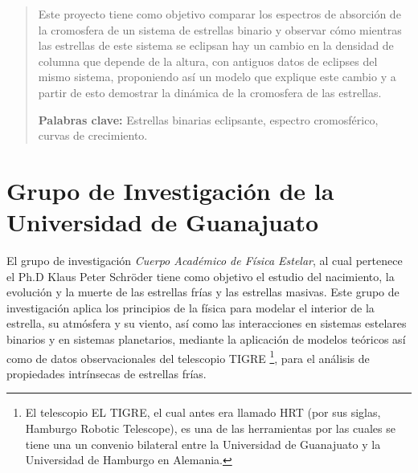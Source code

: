 \documentclass[11pt]{article}
\begin{document}
\newpage
\begin{abstract}
\noindent Este proyecto tiene como objetivo comparar los espectros de absorción de la cromosfera de un sistema de estrellas binario y observar cómo mientras las estrellas de este sistema se eclipsan hay un cambio en la densidad de columna que depende de la altura, con antiguos datos de eclipses del mismo sistema, proponiendo así un modelo que explique este cambio y a partir de esto demostrar la dinámica de la cromosfera de las estrellas.

\vspace{0.5cm}
\textbf{Palabras clave:} Estrellas binarias eclipsante, espectro cromosférico, curvas de crecimiento.

\end{abstract}


\begin{figure}
  \centering

  \label{Figura 1}
\end{figure}


\section{Grupo de Investigación de la Universidad de Guanajuato}

El grupo de investigación \textit{Cuerpo Académico de Física Estelar}, al cual pertenece el Ph.D Klaus Peter Schröder tiene como objetivo el estudio del nacimiento, la evolución y la muerte de las estrellas frías y las estrellas masivas.  Este grupo de investigación aplica los principios de la física para modelar el interior de la estrella, su atmósfera y su viento, así como las interacciones en sistemas estelares binarios y en sistemas planetarios, mediante la aplicación de modelos teóricos así como de datos observacionales del telescopio TIGRE \footnote{El telescopio  EL TIGRE, el cual antes era llamado HRT (por sus siglas, Hamburgo Robotic Telescope), es una de las herramientas por las cuales se tiene una un convenio bilateral entre la Universidad de Guanajuato y la Universidad de Hamburgo en Alemania.}, para el análisis de propiedades intrínsecas de estrellas frías.
\end{document}
